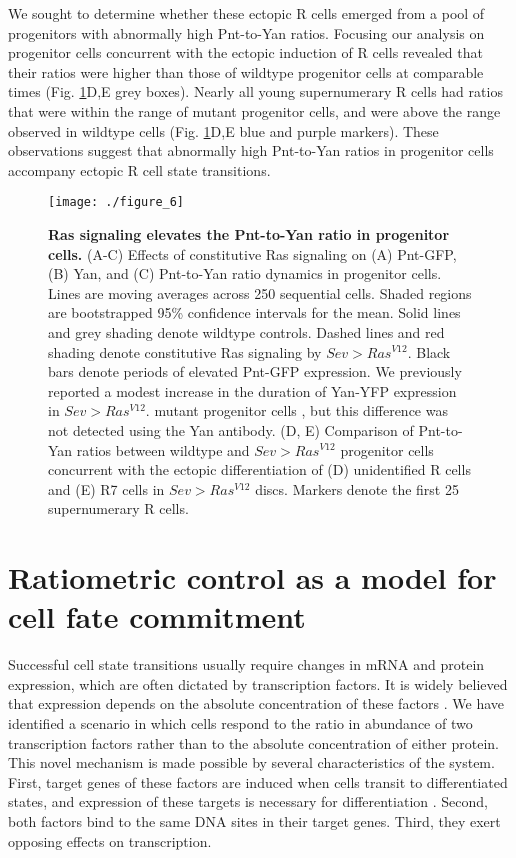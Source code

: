 We sought to determine whether these ectopic R cells emerged from a pool of progenitors with abnormally high Pnt-to-Yan ratios. Focusing our analysis on progenitor cells concurrent with the ectopic induction of R cells revealed that their ratios were higher than those of wildtype progenitor cells at comparable times (Fig. \ref{fig:ratio:fig6}D,E grey boxes). Nearly all young supernumerary R cells had ratios that were within the range of mutant progenitor cells, and were above the range observed in wildtype cells (Fig. \ref{fig:ratio:fig6}D,E blue and purple markers). These observations suggest that abnormally high Pnt-to-Yan ratios in progenitor cells accompany ectopic R cell state transitions.

\begin{figure}[h!]
\centering
\texttt{[image: ./figure\_6]}
\caption[Ras signaling elevates the Pnt-to-Yan ratio in progenitor cells.]{\textbf{Ras signaling elevates the Pnt-to-Yan ratio in progenitor cells.} (A-C) Effects of constitutive Ras signaling on (A) Pnt-GFP, (B) Yan, and (C) Pnt-to-Yan ratio dynamics in progenitor cells. Lines are moving averages across 250 sequential cells. Shaded regions are bootstrapped 95\% confidence intervals for the mean. Solid lines and grey shading denote wildtype controls. Dashed lines and red shading denote constitutive Ras signaling by $Sev>Ras^{V12}$. Black bars denote periods of elevated Pnt-GFP expression. We previously reported a modest increase in the duration of Yan-YFP expression in $Sev>Ras^{V12}$. mutant progenitor cells \cite{Pelaez2015a}, but this difference was not detected using the Yan antibody. (D, E) Comparison of Pnt-to-Yan ratios between wildtype and $Sev>Ras^{V12}$ progenitor cells concurrent with the ectopic differentiation of (D) unidentified R cells and (E) R7 cells in $Sev>Ras^{V12}$ discs. Markers denote the first 25 supernumerary R cells.}
\label{fig:ratio:fig6}
\end{figure}

\section{Ratiometric control as a model for cell fate commitment}

Successful cell state transitions usually require changes in mRNA and protein expression, which are often dictated by transcription factors. It is widely believed that expression depends on the absolute concentration of these factors \cite{Spitz2012}. We have identified a scenario in which cells respond to the ratio in abundance of two transcription factors rather than to the absolute concentration of either protein. This novel mechanism is made possible by several characteristics of the system. First, target genes of these factors are induced when cells transit to differentiated states, and expression of these targets is necessary for differentiation \cite{Xu2000,Nagaraj2002}. Second, both factors bind to the same DNA sites in their target genes. Third, they exert opposing effects on transcription.

